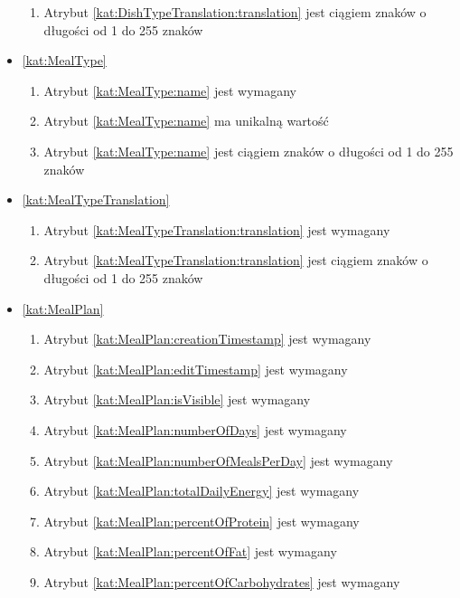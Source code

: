 \begin{itemize}[label={\textbf{Ograniczenia dla}}, wide, labelwidth=!, labelindent=0pt]
\begin{enumerate}[label={\textbf{OGR/\protect\threedigits{\arabic{enumi}}}}, wide, labelwidth=!, align=left, leftmargin=3cm, resume]
        \item Atrybut \ref{kat:DishTypeTranslation:translation} jest ciągiem znaków o długości od 1 do 255 znaków
    \end{enumerate}

    \item\ref{kat:MealType}
    \begin{enumerate}[label={\textbf{OGR/\protect\threedigits{\arabic{enumi}}}}, wide, labelwidth=!, align=left, leftmargin=3cm, resume]
        \item Atrybut \ref{kat:MealType:name} jest wymagany

        \item Atrybut \ref{kat:MealType:name} ma unikalną wartość

        \item Atrybut \ref{kat:MealType:name} jest ciągiem znaków o długości od 1 do 255 znaków
    \end{enumerate}

    \item\ref{kat:MealTypeTranslation}
    \begin{enumerate}[label={\textbf{OGR/\protect\threedigits{\arabic{enumi}}}}, wide, labelwidth=!, align=left, leftmargin=3cm, resume]
        \item Atrybut \ref{kat:MealTypeTranslation:translation} jest wymagany

        \item Atrybut \ref{kat:MealTypeTranslation:translation} jest ciągiem znaków o długości od 1 do 255 znaków
    \end{enumerate}

    \item\ref{kat:MealPlan}
    \begin{enumerate}[label={\textbf{OGR/\protect\threedigits{\arabic{enumi}}}}, wide, labelwidth=!, align=left, leftmargin=3cm, resume]
        \item Atrybut \ref{kat:MealPlan:creationTimestamp} jest wymagany
        \item Atrybut \ref{kat:MealPlan:editTimestamp} jest wymagany
        \item Atrybut \ref{kat:MealPlan:isVisible} jest wymagany
        \item Atrybut \ref{kat:MealPlan:numberOfDays}  jest wymagany
        \item Atrybut \ref{kat:MealPlan:numberOfMealsPerDay} jest wymagany
        \item Atrybut \ref{kat:MealPlan:totalDailyEnergy} jest wymagany
        \item Atrybut \ref{kat:MealPlan:percentOfProtein} jest wymagany
        \item Atrybut \ref{kat:MealPlan:percentOfFat} jest wymagany
        \item Atrybut \ref{kat:MealPlan:percentOfCarbohydrates} jest wymagany


\end{enumerate}
\end{itemize}
